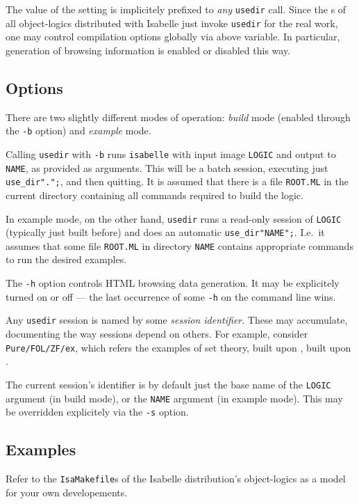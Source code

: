 The value of the  setting is
implicitely prefixed to \emph{any} \texttt{usedir} call. Since the
s of all object-logics distributed with Isabelle
just invoke \texttt{usedir} for the real work, one may control
compilation options globally via above variable. In particular,
generation of  browsing information is enabled or
disabled this way.


\subsection*{Options}

There are two slightly different modes of operation: \emph{build} mode
(enabled through the \texttt{-b} option) and \emph{example} mode.

Calling \texttt{usedir} with \texttt{-b} runs \texttt{isabelle} with
input image \texttt{LOGIC} and output to \texttt{NAME}, as provided as
arguments. This will be a batch session, executing just
\texttt{use_dir".";}, and then quitting. It is assumed
that there is a file \texttt{ROOT.ML} in the current directory
containing all {\ML} commands required to build the logic.

In example mode, on the other hand, \texttt{usedir} runs a read-only
session of \texttt{LOGIC} (typically just built before) and does an
automatic \texttt{use_dir"NAME";}. I.e.\ it assumes that some file
\texttt{ROOT.ML} in directory \texttt{NAME} contains appropriate {\ML}
commands to run the desired examples.

\medskip The \texttt{-h} option controls HTML browsing data
generation. It may be explicitely turned on or off --- the last
occurrence of some \texttt{-h} on the command line wins.

\medskip Any \texttt{usedir} session is named by some \emph{session
  identifier}. These may accumulate, documenting the way sessions
depend on others. For example, consider \texttt{Pure/FOL/ZF/ex}, which
refers the examples of {\ZF} set theory, built upon {\FOL}, built upon
{\Pure}.

The current session's identifier is by default just the base name of
the \texttt{LOGIC} argument (in build mode), or the \texttt{NAME}
argument (in example mode). This may be overridden explicitely via the
\texttt{-s} option.


\subsection*{Examples}

Refer to the \texttt{IsaMakefile}s of the Isabelle distribution's
object-logics as a model for your own developements.
